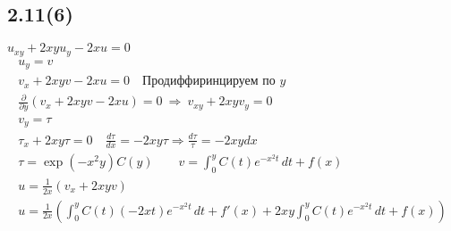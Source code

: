 \subsection{2.11(6)}
$u_{xy}+2xyu_{y}-2xu=0$ \\
\begin{gather*}
 u_{y}=v \\
 v_{x}+2xyv-2xu=0 \quad \text{Продиффиринцируем по $y$} \\
 \frac{\partial}{\partial y}( v_{x}+2xyv-2xu)=0  \ \Rightarrow \ v_{xy}+2xyv_{y}=0 \\
 v_{y}=\tau \\
 \tau_{x}+2xy\tau=0 \quad \frac{d\tau}{dx}=-2xy\tau \Rightarrow \frac{d\tau}{\tau} = -2xydx \\
 \tau = \exp(-x^{2}y)C(y) \qquad v = \int_{0}^{y} C(t)e^{-x^{2}t} \,dt+f(x) \\
 u = \frac{1}{2x}(v_{x}+2xyv) \\
 \boxed{u = \frac{1}{2x}\left(\int_{0}^{y} C(t)(-2xt)e^{-x^{2}t} \,dt+f'(x)+2xy\int_{0}^{y} C(t)e^{-x^{2}t} \,dt+f(x) \right)}\\
\end{gather*}
